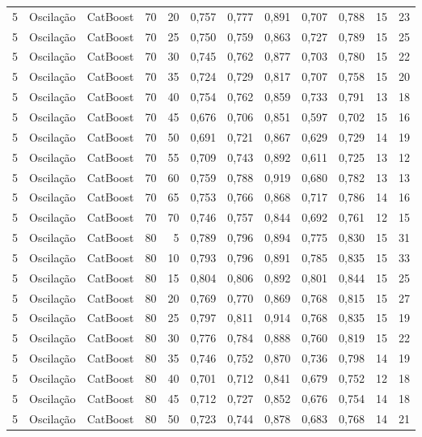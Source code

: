 \begin{longtable}{ccclrrrrrrrr}
5 & Oscilação & CatBoost & 70 & 20 & 0,757 & 0,777 & 0,891 & 0,707 & 0,788 & 15 & 23 \\
5 & Oscilação & CatBoost & 70 & 25 & 0,750 & 0,759 & 0,863 & 0,727 & 0,789 & 15 & 25 \\
5 & Oscilação & CatBoost & 70 & 30 & 0,745 & 0,762 & 0,877 & 0,703 & 0,780 & 15 & 22 \\
5 & Oscilação & CatBoost & 70 & 35 & 0,724 & 0,729 & 0,817 & 0,707 & 0,758 & 15 & 20 \\
5 & Oscilação & CatBoost & 70 & 40 & 0,754 & 0,762 & 0,859 & 0,733 & 0,791 & 13 & 18 \\
5 & Oscilação & CatBoost & 70 & 45 & 0,676 & 0,706 & 0,851 & 0,597 & 0,702 & 15 & 16 \\
5 & Oscilação & CatBoost & 70 & 50 & 0,691 & 0,721 & 0,867 & 0,629 & 0,729 & 14 & 19 \\
5 & Oscilação & CatBoost & 70 & 55 & 0,709 & 0,743 & 0,892 & 0,611 & 0,725 & 13 & 12 \\
5 & Oscilação & CatBoost & 70 & 60 & 0,759 & 0,788 & 0,919 & 0,680 & 0,782 & 13 & 13 \\
5 & Oscilação & CatBoost & 70 & 65 & 0,753 & 0,766 & 0,868 & 0,717 & 0,786 & 14 & 16 \\
5 & Oscilação & CatBoost & 70 & 70 & 0,746 & 0,757 & 0,844 & 0,692 & 0,761 & 12 & 15 \\
5 & Oscilação & CatBoost & 80 & 5 & 0,789 & 0,796 & 0,894 & 0,775 & 0,830 & 15 & 31 \\
5 & Oscilação & CatBoost & 80 & 10 & 0,793 & 0,796 & 0,891 & 0,785 & 0,835 & 15 & 33 \\
5 & Oscilação & CatBoost & 80 & 15 & 0,804 & 0,806 & 0,892 & 0,801 & 0,844 & 15 & 25 \\
5 & Oscilação & CatBoost & 80 & 20 & 0,769 & 0,770 & 0,869 & 0,768 & 0,815 & 15 & 27 \\
5 & Oscilação & CatBoost & 80 & 25 & 0,797 & 0,811 & 0,914 & 0,768 & 0,835 & 15 & 19 \\
5 & Oscilação & CatBoost & 80 & 30 & 0,776 & 0,784 & 0,888 & 0,760 & 0,819 & 15 & 22 \\
5 & Oscilação & CatBoost & 80 & 35 & 0,746 & 0,752 & 0,870 & 0,736 & 0,798 & 14 & 19 \\
5 & Oscilação & CatBoost & 80 & 40 & 0,701 & 0,712 & 0,841 & 0,679 & 0,752 & 12 & 18 \\
5 & Oscilação & CatBoost & 80 & 45 & 0,712 & 0,727 & 0,852 & 0,676 & 0,754 & 14 & 18 \\
5 & Oscilação & CatBoost & 80 & 50 & 0,723 & 0,744 & 0,878 & 0,683 & 0,768 & 14 & 21 \\

\end{longtable}
